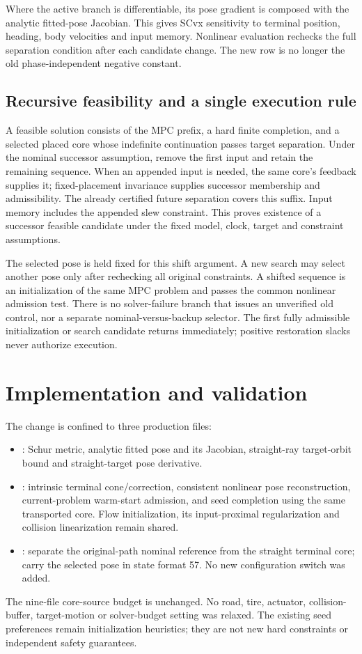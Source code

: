 \documentclass[11pt]{article}
\begin{document}
Where the active branch is differentiable, its pose gradient is composed with
the analytic fitted-pose Jacobian. This gives SCvx sensitivity to terminal
position, heading, body velocities and input memory. Nonlinear evaluation
rechecks the full separation condition after each candidate change. The new
row is no longer the old phase-independent negative constant.

\subsection{Recursive feasibility and a single execution rule}
A feasible solution consists of the MPC prefix, a hard finite completion,
and a selected placed core whose indefinite continuation passes target
separation. Under the nominal successor assumption, remove the first input
and retain the remaining sequence. When an appended input is needed, the
same core's feedback supplies it; fixed-placement invariance supplies
successor membership and admissibility. The already certified future
separation covers this suffix. Input memory includes the appended slew
constraint. This proves existence of a successor feasible candidate under
the fixed model, clock, target and constraint assumptions.

The selected pose is held fixed for this shift argument. A new search may
select another pose only after rechecking all original constraints. A shifted
sequence is an initialization of the same MPC problem and passes the common
nonlinear admission test. There is no solver-failure branch that issues an
unverified old control, nor a separate nominal-versus-backup selector. The
first fully admissible initialization or search candidate returns immediately;
positive restoration slacks never authorize execution.

\section{Implementation and validation}
The change is confined to three production files:
\begin{itemize}
\item {}: Schur metric, analytic fitted pose and
its Jacobian, straight-ray target-orbit bound and straight-target pose derivative.
\item {}: intrinsic terminal cone/correction,
consistent nonlinear pose reconstruction, current-problem warm-start admission,
and seed completion using the same transported core. Flow initialization,
its input-proximal regularization and collision linearization remain shared.
\item {}: separate the original-path
nominal reference from the straight terminal core; carry the selected pose
in state format 57. No new configuration switch was added.
\end{itemize}
The nine-file core-source budget is unchanged. No road, tire, actuator,
collision-buffer, target-motion or solver-budget setting was relaxed. The
existing seed preferences remain initialization heuristics; they are not new
hard constraints or independent safety guarantees.
\end{document}
